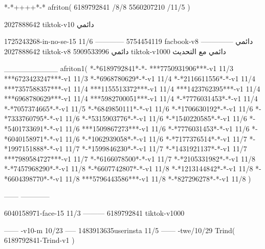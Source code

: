 *-*++++*-*
afriton(
6189792841 /8/8
5560207210 /11/5
)

2027888642 tiktok-v10
دائمي

1725243268-in-no-se-15 11/6
------------
5754454119 facbook-v8
دائمي
--------------
2027888642 tiktok-v8
دائمي
5909533996 tiktok-v1000
دائمي مع التحديث

__________
afriton1(
*-*6189792841*-*-
***7750931906***-v1 11/3
***6723423247***-v1 11/3
*-*6968780629*-*-v1 11/4
*-*2116611556*-*-v1 11/4
***7357588357***-v1 11/4
***1155513372***-v1 11/4
***1423762395***-v1 11/4
***6968780629***-v1 11/4
***5982700051***-v1 11/4
*-*7776031453*-*-v1 11/4
*-*7057374665*-*-v1 11/5
*-*6849850111*-*-v1 11/6
*-*1706630192*-*-v1 11/6
*-*7333760795*-*-v1 11/6
*-*5315903776*-*-v1 11/6
*-*1540220585*-*-v1 11/6
*-*5401733691*-*-v1 11/6
***1509867273***-v1 11/6
*-*7776031453*-*-v1 11/6
*-*6040158971*-*-v1 11/6
*-*1062939058*-*-v1 11/6
*-*7177376514*-*-v1 11/7
*-*1997151888*-*-v1 11/7
*-*1599846230*-*-v1 11/7
*-*1431921137*-*-v1 11/7
***7989584727***-v1 11/7
*-*6166078500*-*-v1 11/7
*-*2105331982*-*-v1 11/8
*-*7457968290*-*-v1 11/8
*-*6607742807*-*-v1 11/8
*-*1213144842*-*-v1 11/8
*-*6604398770*-*-v1 11/8
***5796443586***-v1 11/8
*-*827296278*-*-v1 11/8
)

------
------------

6040158971-face-15 11/3
---------
6189792841 tiktok-v1000

------
-v10-m 10/23
-----
1483913635userinsta 11/5
------
-twe/10/29
Trind(
6189792841-Trind-v1 
)
